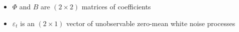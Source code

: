 \begin{frame}
\begin{itemize}
\begin{itemize}
\item $\Phi $ and $B$ are $(2\times 2)$ matrices of coefficients\medskip

\item $\varepsilon _{t}$ is an $(2\times 1)$ vector of unobservable
zero-mean white noise processes
\end{itemize}
\end{itemize}

\end{frame}


